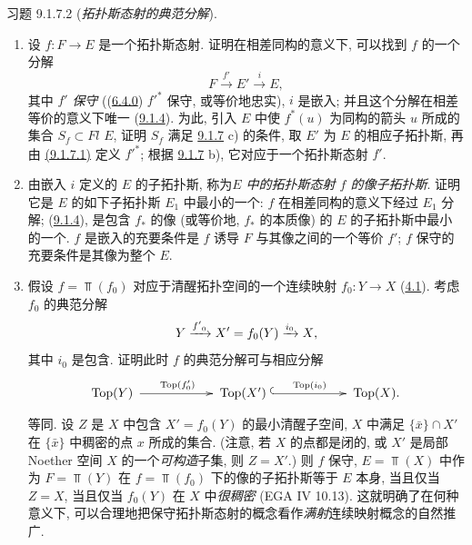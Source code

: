 \begin{enonce*}[remark]{习题 9.1.7.2}
(\emph{拓扑斯态射的典范分解}).
\begin{enumerate}
\renewcommand{\theenumi}{\alph{enumi}}
\renewcommand{\labelenumi}{\theenumi)}
\item 设 $f:F\longrightarrow E$ 是一个拓扑斯态射.
证明在相差同构的意义下, 可以找到 $f$ 的一个分解
\begin{equation*}
F\xrightarrow{f'}E'\xrightarrow{i} E,\tag{9.1.7.3}
\end{equation*}
其中 $f'$ \emph{保守}
(\ie (\hyperref[IV.subsubsec6.4.0]{6.4.0})
${f'}^{\ast}$ 保守, 或等价地忠实)\pageoriginale,
$i$ 是嵌入;
并且这个分解在相差等价的意义下唯一
(\cf \hyperref[IV.prop9.1.4]{9.1.4}).
为此, 引入 $E$ 中使 $f^{\ast}(u)$ 为同构的箭头 $u$ 所成的集合 $S_f\subset Fl$ $E$,
证明 $S_f$ 满足 \hyperref[IV.exer9.1.7]{9.1.7} c) 的条件,
取 $E'$ 为 $E$ 的相应子拓扑斯,
再由 \hyperref[IV.eq9.1.7.1]{(9.1.7.1)} 定义 ${f'}^{\ast}$;
根据 \hyperref[IV.exer9.1.7]{9.1.7} b), 它对应于一个拓扑斯态射 $f'$.

\item 由嵌入 $i$ 定义的 $E$ 的子拓扑斯,
称为\emph{$E$ 中的拓扑斯态射 $f$ 的像子拓扑斯}.
证明它是 $E$ 的如下子拓扑斯 $E_1$ 中最小的一个:
$f$ 在相差同构的意义下经过 $E_1$ 分解;
\ie (\hyperref[IV.prop9.1.4]{9.1.4}),
是包含 $f_{\ast}$ 的像 (或等价地, $f_{\ast}$ 的本质像) 的 $E$ 的子拓扑斯中最小的一个.
$f$ 是嵌入的充要条件是 $f$ 诱导 $F$ 与其像之间的一个等价 $f'$;
$f$ 保守的充要条件是其像为整个 $E$.

\item 假设 $f=\Top(f_0)$ 对应于清醒拓扑空间的一个连续映射
$f_0:Y\rightarrow X$ (\hyperref[IV.subsec4.1]{4.1}).
考虑 $f_0$ 的典范分解
$$
Y\xrightarrow{{f'}_0}X'=f_0(Y)\xrightarrow{i_0}X{},
$$
其中 $i_0$ 是包含.
证明此时 $f$ 的典范分解可与相应分解
\[
\xymatrix@C=2cm@M=.2cm{ \Top(Y) \ar[r]^{\Top(f'_0)}& \Top(X')
\ar@{^{(}->}[r]^{\Top(i_0)}& \Top(X). }
\]
等同. 设 $Z$ 是 $X$ 中包含 $X'=f_0(Y)$ 的最小清醒子空间,
\ie $X$ 中满足 $\{\bar{x}\}\cap X'$ 在 $\{\bar{x}\}$ 中稠密的点 $x$ 所成的集合.
(注意, 若 $X$ 的点都是闭的,
或 $X'$ 是局部 Noether 空间 $X$ 的一个\emph{可构造}子集, 则 $Z=X'$.)
则 $f$ 保守,
\ie $E=\Top(X)$ 中作为 $F=\Top(Y)$ 在 $f=\Top(f_0)$ 下的像的子拓扑斯等于 $E$ 本身,
当且仅当 $Z=X$,
\ie 当且仅当 $f_0(Y)$ 在 $X$ 中\emph{很稠密} (EGA IV 10.13).
这就明确了在何种意义下,
可以合理地把保守拓扑斯态射的概念看作\emph{满射}连续映射概念的自然推广.


\end{enumerate}
\end{enonce*}
